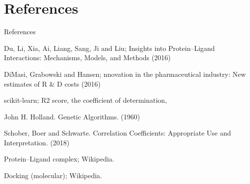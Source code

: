\documentclass{beamer}
\begin{document}
\section{References}

\begin{frame}[t]{References}

\begin{thebibliography}{1}

\alert{Du,  Li,  Xia,  Ai,  Liang,  Sang,  Ji and Liu; Insights into Protein–Ligand Interactions: Mechanisms, Models, and Methods (2016)}

\alert{DiMasi,  Grabowski and Hansen; nnovation in the pharmaceutical industry: New estimates of R \& D costs (2016)}

\alert{scikit-learn; R2 score, the coefficient of determination},

\alert{John H. Holland.  Genetic Algorithms. (1960)}

\alert{Schober, Boer and Schwarte. Correlation Coefficients: Appropriate Use and Interpretation. (2018)}

\alert{Protein–Ligand complex; Wikipedia.}

\alert{Docking (molecular); Wikipedia.}

\end{thebibliography}

\end{frame}
\end{document}
